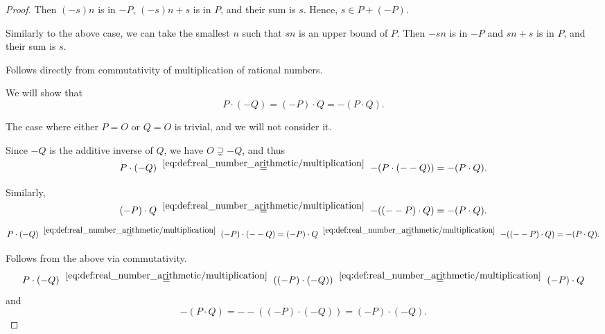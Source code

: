 \begin{proof}
  Then \( (-s)n \) is in \( -P \), \( (-s)n + s \) is in \( P \), and their sum is \( s \). Hence, \( s \in P + (-P) \).

   Similarly to the above case, we can take the smallest \( n \) such that \( sn \) is an upper bound of \( P \). Then \( -sn \) is in \( -P \) and \( sn + s \) is in \( P \), and their sum is \( s \).

   Follows directly from commutativity of multiplication of rational numbers.

   We will show that
  \begin{equation}\label{eq:thm:real_numbers_are_a_field/mult_additive_inverses}
    P \cdot (-Q) = (-P) \cdot Q = -(P \cdot Q).
  \end{equation}

  The case where either \( P = O \) or \( Q = O \) is trivial, and we will not consider it.

   Since \( -Q \) is the additive inverse of \( Q \), we have \( O \supsetneq -Q \), and thus
  \begin{equation*}
    P \cdot (-Q)
    \reloset {\eqref{eq:def:real_number_arithmetic/multiplication}} =
    -(P \cdot (--Q))
    =
    -(P \cdot Q).
  \end{equation*}

  Similarly,
  \begin{equation*}
    (-P) \cdot Q
    \reloset {\eqref{eq:def:real_number_arithmetic/multiplication}} =
    -((--P) \cdot Q)
    =
    -(P \cdot Q).
  \end{equation*}

  \begin{equation*}
    P \cdot (-Q)
    \reloset {\eqref{eq:def:real_number_arithmetic/multiplication}} =
    (-P) \cdot (--Q)
    =
    (-P) \cdot Q
    \reloset {\eqref{eq:def:real_number_arithmetic/multiplication}} =
    -((--P) \cdot Q)
    =
    -(P \cdot Q).
  \end{equation*}

   Follows from the above via commutativity.

  \begin{equation*}
    P \cdot (-Q)
    \reloset {\eqref{eq:def:real_number_arithmetic/multiplication}} =
    ((-P) \cdot (-Q))
    \reloset {\eqref{eq:def:real_number_arithmetic/multiplication}} =
    (-P) \cdot Q
  \end{equation*}
  and
  \begin{equation*}
    -(P \cdot Q)
    =
    --((-P) \cdot (-Q))
    =
    (-P) \cdot (-Q).
  \end{equation*}


\end{proof}
